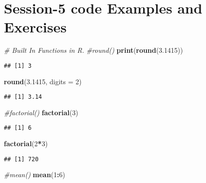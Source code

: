 \documentclass[
]{article}
\newenvironment{Shaded}{\begin{snugshade}}{\end{snugshade}}
\newcommand{\AttributeTok}[1]{\textcolor[rgb]{0.13,0.29,0.53}{#1}}
\newcommand{\CommentTok}[1]{\textcolor[rgb]{0.56,0.35,0.01}{\textit{#1}}}
\newcommand{\DecValTok}[1]{\textcolor[rgb]{0.00,0.00,0.81}{#1}}
\newcommand{\FloatTok}[1]{\textcolor[rgb]{0.00,0.00,0.81}{#1}}
\newcommand{\FunctionTok}[1]{\textcolor[rgb]{0.13,0.29,0.53}{\textbf{#1}}}
\newcommand{\NormalTok}[1]{#1}
\newcommand{\SpecialCharTok}[1]{\textcolor[rgb]{0.81,0.36,0.00}{\textbf{#1}}}
\begin{document}
\section{Session-5 code Examples and
Exercises}\label{session-5-code-examples-and-exercises}

\begin{Shaded}
\begin{Highlighting}[]
\CommentTok{\# Built In Functions in R.}
\CommentTok{\#round() }
\FunctionTok{print}\NormalTok{(}\FunctionTok{round}\NormalTok{(}\FloatTok{3.1415}\NormalTok{)) }
\end{Highlighting}
\end{Shaded}

\begin{verbatim}
## [1] 3
\end{verbatim}

\begin{Shaded}
\begin{Highlighting}[]
\FunctionTok{round}\NormalTok{(}\FloatTok{3.1415}\NormalTok{, }\AttributeTok{digits =} \DecValTok{2}\NormalTok{)}
\end{Highlighting}
\end{Shaded}

\begin{verbatim}
## [1] 3.14
\end{verbatim}

\begin{Shaded}
\begin{Highlighting}[]
\CommentTok{\#factorial()}
\FunctionTok{factorial}\NormalTok{(}\DecValTok{3}\NormalTok{) }
\end{Highlighting}
\end{Shaded}

\begin{verbatim}
## [1] 6
\end{verbatim}

\begin{Shaded}
\begin{Highlighting}[]
\FunctionTok{factorial}\NormalTok{(}\DecValTok{2}\SpecialCharTok{*}\DecValTok{3}\NormalTok{)}
\end{Highlighting}
\end{Shaded}

\begin{verbatim}
## [1] 720
\end{verbatim}

\begin{Shaded}
\begin{Highlighting}[]
\CommentTok{\#mean()}
\FunctionTok{mean}\NormalTok{(}\DecValTok{1}\SpecialCharTok{:}\DecValTok{6}\NormalTok{) }
\end{Highlighting}
\end{Shaded}
\end{document}
